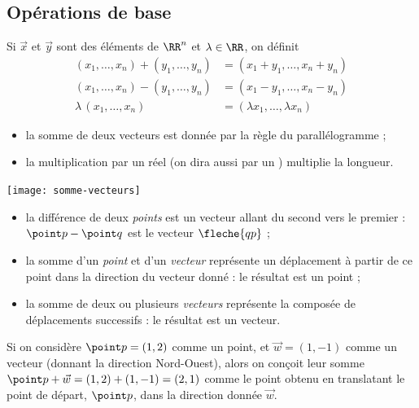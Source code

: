 \documentclass[french,xcolor=svgnames]{beamer}
\begin{document}
\subsection{Opérations de base}
\begin{frame}%
  Si \(\vec {x}\) et \(\vec {y}\) sont des éléments de \(\RR^{n}\) et \(\lambda\in \RR\), on définit\pause
  \begin{align*}
    (x_{1}, \ldots, x_{n}) + (y_{1}, \ldots, y_{n}) &= (x_{1}+y_{1}, \ldots, x_{n}+y_{n}) \\
    (x_{1}, \ldots, x_{n}) - (y_{1}, \ldots, y_{n}) &= (x_{1}-y_{1}, \ldots, x_{n}-y_{n}) \\
    \lambda\, (x_{1}, \ldots, x_{n}) &= (\lambda x_{1}, \ldots, \lambda x_{n})
  \end{align*}
\end{frame}

\begin{frame}%
  \begin{itemize}
  \item la somme de deux vecteurs est donnée par la règle du parallélogramme ;
  \item la multiplication par un réel (on dira aussi \og par un \fg{}) multiplie la longueur.
  \end{itemize}

  \begin{center}
    \texttt{[image: somme-vecteurs]}
  \end{center}
\end{frame}

\begin{frame}
\begin{itemize}
\item la différence de deux \emph{points} est un vecteur allant du second vers le premier : \(\point p - \point q\) est le vecteur \(\fleche{qp}\) ;
\item la somme d'un \emph{point} et d'un \emph{vecteur} représente un déplacement à partir de ce point dans la direction du vecteur donné : le résultat est un point ;
\item la somme de deux ou plusieurs \emph{vecteurs} représente la composée de déplacements successifs : le résultat est un vecteur.
\end{itemize}

\begin{example}
  Si on considère $\point p = (1,2)$ comme un point, et \(\vec w = (1,-1)\) comme un vecteur (donnant la direction \og Nord-Ouest\fg{}), alors on conçoit leur somme \(\point p + \vec w = (1,2) + (1,-1) = (2,1)\) comme le point obtenu en translatant le point de départ, \(\point p\), dans la direction donnée \(\vec w\).
\end{example}
\end{frame}
\end{document}

